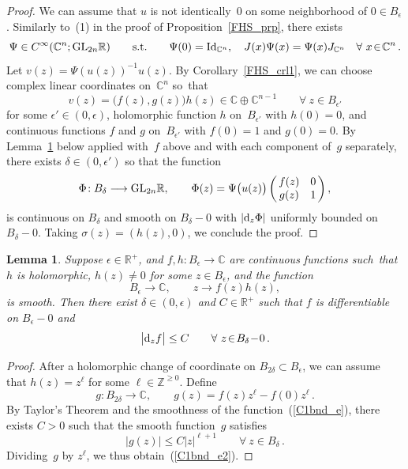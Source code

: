 \documentclass[11pt]{article}
\numberwithin{equation}{section}
\newtheorem{lmm}[thm]{Lemma}
\theoremstyle{definition}
\def\BE#1{\begin{equation}\label{#1}}
\def\EE{\end{equation}}
\def\eref#1{(\ref{#1})}
\def\lra{\longrightarrow}
\def\C{\mathbb{C}}
\def\R{\mathbb R}
\def\Z{{\mathbb Z}}
\def\de{\delta}
\def\ep{\epsilon}
\def\si{\sigma}
\def\i{\infty}
\def\GL{\textnormal{GL}}
\def\Id{\textnormal{Id}}
\def\nd{\textnormal{d}}
\begin{document}
\begin{proof} We can assume that $u$ is not identically~0 on some neighborhood of $0\!\in\!B_{\ep}$.
Similarly to~(1) in the proof of Proposition~\ref{FHS_prp}, there exists
$$\Psi\in C^{\i}(\C^n;\GL_{2n}\R) \qquad\hbox{s.t.}\qquad
\Psi(0)=\Id_{\C^n}, \quad
J(x)\Psi(x)=\Psi(x)J_{\C^n}~~~\forall~x\!\in\!\C^n\,.$$
Let $v(z)\!=\!\Psi(u(z))^{-1}u(z)$.
By Corollary~\ref{FHS_crl1}, we can choose complex linear coordinates on~$\C^n$ so~that 
$$v(z)=\big(f(z),g(z)\big)h(z) \in \C\!\oplus\!\C^{n-1} \qquad\forall~z\!\in\!B_{\ep'}$$
for some $\ep'\!\in\!(0,\ep)$, holomorphic function $h$ on~$B_{\ep'}$ with $h(0)\!=\!0$, 
and continuous functions $f$ and $g$ on~$B_{\ep'}$ with $f(0)\!=\!1$ and $g(0)\!=\!0$.
By Lemma~\ref{C1bnd_lmm} below applied with~$f$ above and with each component of~$g$ separately, 
there exists $\de\!\in\!(0,\ep')$ so that 
the function 
$$\Phi\!:B_{\de}\lra\GL_{2n}\R, \qquad 
\Phi(z)=\Psi\big(u(z)\big)
\left(\!\!\begin{array}{cc} f(z)& 0\\ g(z)& 1\end{array}\!\!\right),$$
is continuous on $B_{\de}$ and smooth on $B_{\de}\!-\!0$ with
$|\nd_z\Phi|$  uniformly bounded  on $B_{\de}\!-\!0$.
Taking \hbox{$\si(z)\!=\!(h(z),0)$}, we conclude the proof.
\end{proof}




\begin{lmm}\label{C1bnd_lmm}
Suppose $\ep\!\in\!\R^+$, and 
$f,h\!:B_{\ep}\!\lra\!\C$ are continuous functions such~that
$h$ is holomorphic, $h(z)\!\!\neq\!0$ for some $z\!\in\!B_{\ep}$, and
the function
\BE{C1bnd_e}B_{\ep}\lra\C, \qquad z\lra f(z)h(z),\EE
is smooth. 
Then there exist $\de\!\in\!(0,\ep)$ and $C\!\in\!\R^+$ such that 
$f$ is differentiable on $B_{\ep}\!-\!0$ and
\BE{C1bnd_e2}\big|\nd_zf\big|\le C \qquad\forall~z\!\in\!B_{\de}\!-\!0\,.\EE
\end{lmm}

\begin{proof} After a holomorphic change of coordinate on $B_{2\de}\!\subset\!B_{\ep}$,
we can assume that $h(z)\!=\!z^{\ell}$ for some $\ell\!\in\!\Z^{\ge0}$.
Define
$$g\!: B_{2\de}\lra\C, \qquad g(z)=f(z)z^{\ell}-f(0)z^{\ell}\,.$$
By Taylor's Theorem and the smoothness of the function~\eref{C1bnd_e}, 
there exists $C\!>\!0$ such that the smooth function~$g$ satisfies
$$\big|g(z)\big|\le C|z|^{\ell+1} \qquad \forall~z\!\in\!B_{\de}\,.$$
Dividing~$g$ by $z^{\ell}$, we thus obtain~\eref{C1bnd_e2}.
\end{proof}
\end{document}
